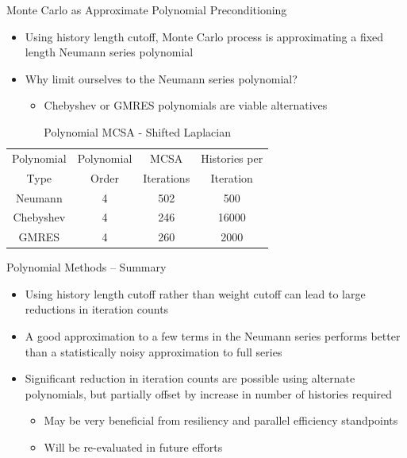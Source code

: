\documentclass{beamer}
\begin{document}

\begin{frame}{Monte Carlo as Approximate Polynomial Preconditioning}
  \begin{itemize}
    \item Using history length cutoff, Monte Carlo process is approximating
      a fixed length Neumann series polynomial
    \vfill
    \item Why limit ourselves to the Neumann series polynomial?
      \begin{itemize}
        \item Chebyshev or GMRES polynomials are viable alternatives
      \end{itemize}
  \end{itemize}

  \begin{table}
    \caption{Polynomial MCSA - Shifted Laplacian}
    \centering
    \begin{tabular}{cccc}
      \toprule
      Polynomial & Polynomial & MCSA & Histories per \\
      Type & Order & Iterations & Iteration \\
      \midrule
      Neumann & 4 & 502 & 500 \\
      Chebyshev & 4 & 246 & 16000 \\
      GMRES & 4 & 260 & 2000 \\
      \bottomrule
    \end{tabular}
  \end{table}
\end{frame}


\begin{frame}{Polynomial Methods -- Summary}
  \begin{itemize}
    \item Using history length cutoff rather than weight cutoff can lead to
      large reductions in iteration counts
      \vfill
    \item A good approximation to a few terms in the Neumann series
      performs better than a statistically noisy approximation to
      full series
      \vfill
    \item Significant reduction in iteration counts are possible using
      alternate polynomials, but partially offset by increase in number
      of histories required
      \begin{itemize}
        \item May be very beneficial from resiliency and parallel efficiency
          standpoints
        \item Will be re-evaluated in future efforts
      \end{itemize}
  \end{itemize}
\end{frame}
\end{document}
